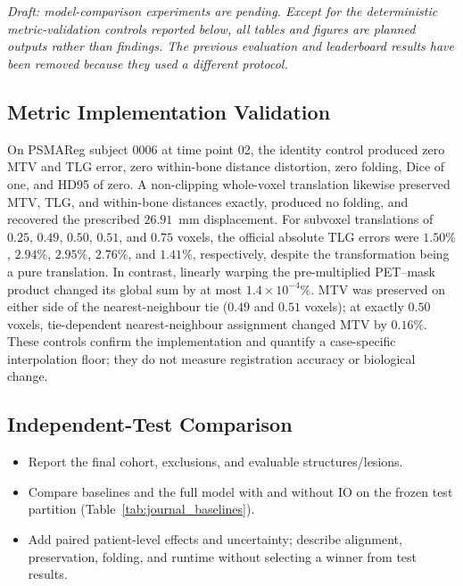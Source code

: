 \section{}
\begin{journaladdition}
\noindent\textit{Draft: model-comparison experiments are pending. Except for the deterministic metric-validation controls reported below, all tables and figures are planned outputs rather than findings. The previous evaluation and leaderboard results have been removed because they used a different protocol.}

\subsection{Metric Implementation Validation}
On PSMAReg subject 0006 at time point 02, the identity control produced zero MTV and TLG error, zero within-bone distance distortion, zero folding, Dice of one, and HD95 of zero.
A non-clipping whole-voxel translation likewise preserved MTV, TLG, and within-bone distances exactly, produced no folding, and recovered the prescribed $26.91$~mm displacement.
For subvoxel translations of $0.25$, $0.49$, $0.50$, $0.51$, and $0.75$ voxels, the official absolute TLG errors were $1.50\%$, $2.94\%$, $2.95\%$, $2.76\%$, and $1.41\%$, respectively, despite the transformation being a pure translation.
In contrast, linearly warping the pre-multiplied PET--mask product changed its global sum by at most $1.4\times10^{-4}\%$.
MTV was preserved on either side of the nearest-neighbour tie ($0.49$ and $0.51$ voxels); at exactly $0.50$ voxels, tie-dependent nearest-neighbour assignment changed MTV by $0.16\%$.
These controls confirm the implementation and quantify a case-specific interpolation floor; they do not measure registration accuracy or biological change.

\subsection{Independent-Test Comparison}
\begin{itemize}
  \item Report the final cohort, exclusions, and evaluable structures/lesions.
  \item Compare baselines and the full model with and without IO on the frozen test partition (Table~\ref{tab:journal_baselines}).
  \item Add paired patient-level effects and uncertainty; describe alignment, preservation, folding, and runtime without selecting a winner from test results.
\end{itemize}
\end{journaladdition}


